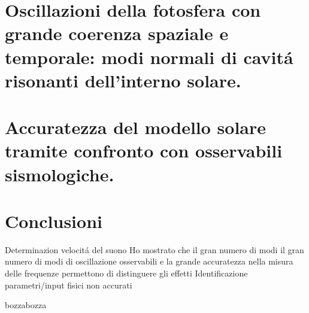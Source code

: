 \documentclass[twoside,11pt,fleqn]{memoir}%
\def\versione{bozza}%
\def\bozza{bozza}
\begin{document}
\cleartorecto
\part{Oscillazioni della fotosfera con grande coerenza spaziale e temporale: modi normali di cavit\'a risonanti dell'interno solare.}



\cleartorecto
\part{Accuratezza del modello solare tramite confronto con osservabili sismologiche.}



\part{Conclusioni}

\begin{workout}[Conclusioni]
Determinazion velocit\'a del suono
Ho mostrato che il gran numero di modi il gran numero di modi di oscillazione osservabili e la grande accuratezza nella misura delle frequenze permettono di distinguere gli effetti 
Identificazione parametri/input fisici non accurati
\end{workout}

{\let\clearpage\relax\let\cleardoublepage\relax
\backmatter
}

%
{\let\clearpage\relax\let\cleardoublepage\relax
\printbibliography
\listoffigures
}

\ifx\versione\bozza
\woc
\erratac
\fi
\end{document}
